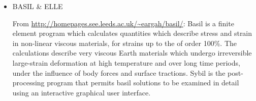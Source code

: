 \begin{itemize}
\begin{scriptsize}
\begin{itemize}
                             \textcite{perr19}
\item[\twothousandtwenty]    \textcite{gadb20},  \textcite{fahm20}, 
                             \textcite{logb20},  \textcite{hect20},  \textcite{hect20b}, 
                             \textcite{glbs20},  \textcite{lerm20}
                             \textcite{nagb20},  \textcite{cilw20},
                             \textcite{hemn20},  \textcite{onlw20}, 
                             \textcite{aslr20},  \textcite{mubi20},
                             \textcite{nemc20},  \textcite{ledb20},
                             \textcite{miac20},  \textcite{with20}
\item[\twothousandtwentyone]   \textcite{balm21}, \textcite{brst21}, \textcite{rasn21},
                               \textcite{sacp21}, \textcite{grrm21},
                               \textcite{hebg21}, \textcite{njsn21}, 
                               \textcite{clhe21}, \textcite{fabh21},
                               \textcite{nebg21}, \textcite{cosb21},
                               \textcite{gona21}, \textcite{sabg21},
                               \textcite{hoco21}, \textcite{frbi21},
                               \textcite{manp21}, \textcite{segp21},
                               \textcite{ribr21}, \textcite{damg21}
\item[\twothousandtwentytwo]   \textcite{thba22}, \textcite{pafl22}, \textcite{behb22},
                               \textcite{onau22}, \textcite{zhlz22}, \textcite{nebg22},
                               \textcite{nebw22}, \textcite{ludn22}, \textcite{heco22},
                               \textcite{bahf22}, \textcite{liya22}, \textcite{wecn22},
                               \textcite{clkl22}, \textcite{baha22}, \textcite{holt22},
                               \textcite{liki22}, \textcite{panb22}
\item[\twothousandtwentythree] \textcite{hepm23}, \textcite{hoal23}, \textcite{wenc23},
                               \textcite{chpd23}, \textcite{zhzw23}
\end{itemize}
\end{scriptsize}

\item {\codefont BASIL \& ELLE} 

From \url{http://homepages.see.leeds.ac.uk/~eargah/basil/}:
Basil is a finite element program which calculates quantities which describe  stress  and strain in non-linear viscous materials, for strains up to the of order 100\%.   
The calculations  describe  very  viscous  Earth materials which undergo irreversible large-strain 
deformation at  high  temperature  and over long time periods, under the influence of body 
forces and surface tractions.  Sybil  is the post-processing program that permits basil 
solutions to be examined in detail using an interactive graphical user interface.


\end{itemize}
